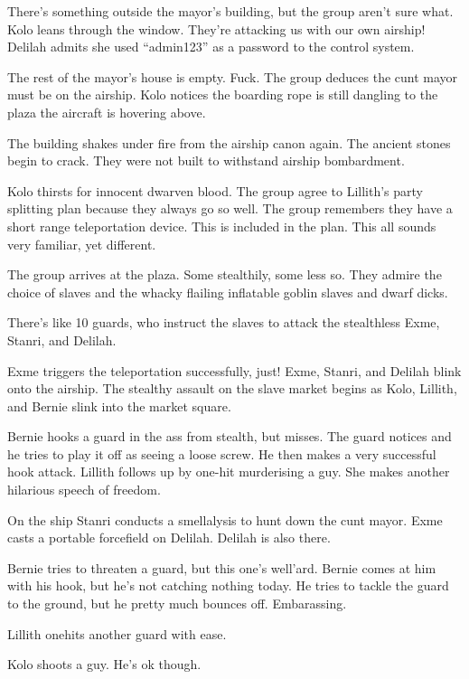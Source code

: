 There’s something outside the mayor’s building, but the group aren’t sure what. Kolo leans through the window. They’re attacking us with our own airship! Delilah admits she used “admin123” as a password to the control system.\medskip

The rest of the mayor’s house is empty. Fuck. The group deduces the cunt mayor must be on the airship. Kolo notices the boarding rope is still dangling to the plaza the aircraft is hovering above.\medskip

The building shakes under fire from the airship canon again. The ancient stones begin to crack. They were not built to withstand airship bombardment.\medskip

Kolo thirsts for innocent dwarven blood. The group agree to Lillith’s party splitting plan because they always go so well. The group remembers they have a short range teleportation device. This is included in the plan. This all sounds very familiar, yet different.\medskip

The group arrives at the plaza. Some stealthily, some less so. They admire the choice of slaves and the whacky flailing inflatable goblin slaves and dwarf dicks.\medskip

There’s like 10 guards, who instruct the slaves to attack the stealthless Exme, Stanri, and Delilah.\medskip

Exme triggers the teleportation successfully, just! Exme, Stanri, and Delilah blink onto the airship. The stealthy assault on the slave market begins as Kolo, Lillith, and Bernie slink into the market square.\medskip

Bernie hooks a guard in the ass from stealth, but misses. The guard notices and he tries to play it off as seeing a loose screw. He then makes a very successful hook attack. Lillith follows up by one-hit murderising a guy. She makes another hilarious speech of freedom.\medskip

On the ship Stanri conducts a smellalysis to hunt down the cunt mayor. Exme casts a portable forcefield on Delilah. Delilah is also there.\medskip

Bernie tries to threaten a guard, but this one’s well’ard. Bernie comes at him with his hook, but he’s not catching nothing today. He tries to tackle the guard to the ground, but he pretty much bounces off. Embarassing.\medskip

Lillith onehits another guard with ease.\medskip

Kolo shoots a guy. He’s ok though.\medskip

